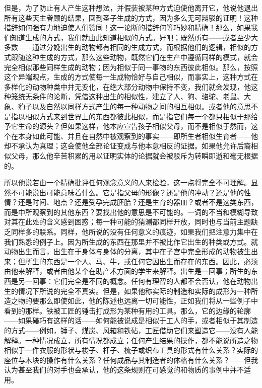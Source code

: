 但是，为了防止有人产生这种想法，并假装被某种方式迫使他离开它，他说他退出所有这些天主眷顾的结果，回到圣子生成的方式，因为多么无可辩驳的证明！这种措辞如何强有力地迫使人们赞同！这一论断的措辞何等巧妙和精确！那么，如果我们知道生成的方式，我们就由此知道相似的方式。好吧；既然所有——或者至少大多数——通过分娩出生的动物都有相同的生成方式，而根据他们的逻辑，相似的方式跟随这种生成的方式，那么这些动物，既然它们在生产中遵循同样的模式，就会完全相似那些同样生成的动物；因为相似于同一事物的东西彼此相似。那么，按照这个异端观点，生成的方式使每一生成物恰好与自己相似，而事实上，这种方式在多样化的动物种类中并无变化，在绝大部分动物中保持不变，我们就会发现，他这种笼统无条件的论断，凭借这种出生的相似性，建立了人、狗、骆驼、老鼠、大象、豹子以及自然以同样方式产生的每一种动物之间的相互相似。或者他的意思不是指以相似方式来到世界上的东西都彼此相似，而是指它们每一个都只相似于那给予它生命的源头？但如果这样，他本应宣告孩子相似父母，而不是相似于然而，这个在本身如此可能、并且在自然中被观察到的事实——即所生者相似生育者——他却不承认为真理；这会使他全部论证变成与他本意相反的证据。如果他允许后裔相似父母，那么他辛苦积累的用以证明实体的论据就会被驳斥为转瞬即逝和毫无根据的。\par

所以他说若由一个精确批评任何观念意义的人来检验，这一点将完全不可理解。显然不可能说出可能意味着什么。它是指父母的形像？还是他的冲动？还是他的性情？还是时间、地点？还是受孕完成胚胎？还是生育的器皿？或者不是这类东西，而是中所观察到的其他东西？要找出他的意思是不可能的。一词的不当和模糊导致对其在此处的含义感到困惑；每一种可能的猜测都同样开放，同时也与当前主题缺乏同样多的联系。同样，他所说的没有任何意义的痕迹，如果我们把注意力集中在我们熟悉的例子上。因为所生成的东西在那里并不被比作它出生的种类或方式。就动物出生而言，出生在于身体与身体的分离，其中在子宫中完全形成的动物被生出来；但所生的东西是一个人、马、牛，或任何它因出生而存在的东西。因此，必须由他来解释，或者由他某个在助产术方面的学生来解释。出生是一回事；所生的东西是另一回事：它们完全是不同的概念。任何有理智的人都不会否认，他在动物出生的情况下所说的完全不真实。但是，如果他称实际的制造和实际的成形为一种所造之物的要那么即使如此，他的陈述也远离一切可能性，正如我们将从一些例子中看到的那样。铁被工匠的锤击打成形为某种有用的工具。那么，它的边缘的轮廓——如果碰巧有这样的话——如何能被说成是相似于工人的手，或者相似于其制造的方式——例如，锤子、煤炭、风箱和铁砧，工匠借助它们来塑造它——没有人能解释。一种情况成立，所有情况都成立；任何产生结果的操作，都不能说所造之物相似于一件衣服的形状与梭子、杆子、梳子或织布工具的形式有什么关系？实际的座位与木块的操作有什么关系？任何成品与其制造者的体格有什么关系？——但我认为甚至我们的对手也会承认，他的这条规则在可感觉的和物质的事例中并不适用。\par

